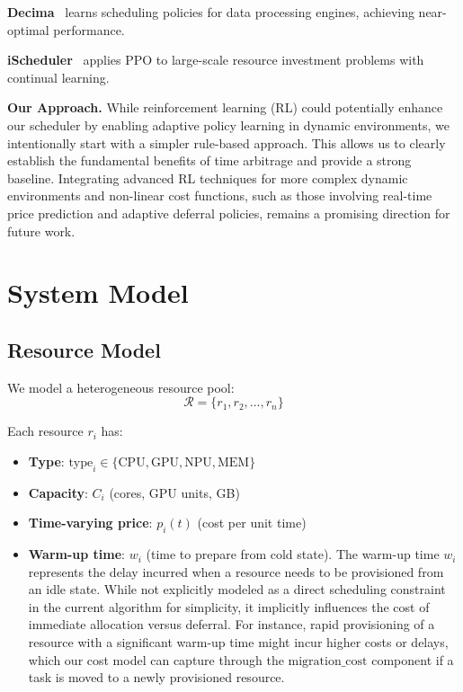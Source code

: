 \documentclass[10pt,conference]{IEEEtran}
\begin{document}
\textbf{Decima}~\cite{decima2018} learns scheduling policies for data processing engines, achieving near-optimal performance.

\textbf{iScheduler}~\cite{iScheduler2020} applies PPO to large-scale resource investment problems with continual learning.

\textbf{Our Approach.} While reinforcement learning (RL) could potentially enhance our scheduler by enabling adaptive policy learning in dynamic environments, we intentionally start with a simpler rule-based approach. This allows us to clearly establish the fundamental benefits of time arbitrage and provide a strong baseline. Integrating advanced RL techniques for more complex dynamic environments and non-linear cost functions, such as those involving real-time price prediction and adaptive deferral policies, remains a promising direction for future work.

\section{System Model}
\label{sec:model}

\subsection{Resource Model}

We model a heterogeneous resource pool:
\begin{equation}
\mathcal{R} = \{r_1, r_2, \ldots, r_n\}
\end{equation}

Each resource $r_i$ has:
\begin{itemize}
    \item \textbf{Type}: $\text{type}_i \in \{\text{CPU}, \text{GPU}, \text{NPU}, \text{MEM}\}$
    \item \textbf{Capacity}: $C_i$ (cores, GPU units, GB)
    \item \textbf{Time-varying price}: $p_i(t)$ (cost per unit time)
    \item \textbf{Warm-up time}: $w_i$ (time to prepare from cold state). The warm-up time $w_i$ represents the delay incurred when a resource needs to be provisioned from an idle state. While not explicitly modeled as a direct scheduling constraint in the current algorithm for simplicity, it implicitly influences the cost of immediate allocation versus deferral. For instance, rapid provisioning of a resource with a significant warm-up time might incur higher costs or delays, which our cost model can capture through the $\text{migration\_cost}$ component if a task is moved to a newly provisioned resource.
\end{itemize}
\end{document}
